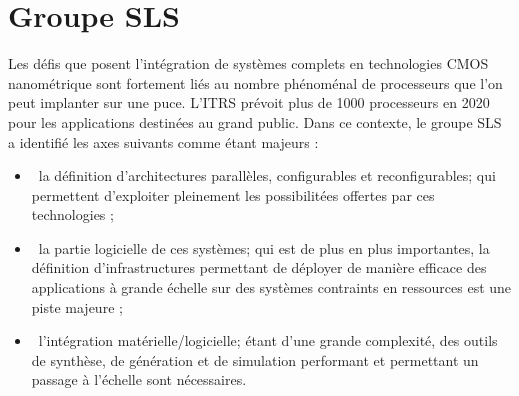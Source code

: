 \section{Groupe SLS}
\label{sec:sls}
Les défis que posent l'intégration de systèmes complets en technologies CMOS nanométrique sont fortement liés au nombre phénoménal de processeurs que l'on peut implanter sur une puce. L'ITRS prévoit plus de 1000 processeurs en 2020 pour les applications destinées au grand public. Dans ce contexte, le groupe SLS a identifié les axes suivants comme étant majeurs :
\begin{itemize}
\item\ la définition d'architectures parallèles, configurables et reconfigurables; qui permettent d'exploiter pleinement les possibilitées offertes par ces technologies ;
\item\ la partie logicielle de ces systèmes; qui est de plus en plus importantes, la définition d'infrastructures permettant de déployer de manière efficace des applications à grande échelle sur des systèmes contraints en ressources est une piste majeure ;
\item\ l'intégration matérielle/logicielle; étant d'une grande complexité, des outils de synthèse, de génération et de simulation performant et permettant un passage à l'échelle sont nécessaires.
\end{itemize}